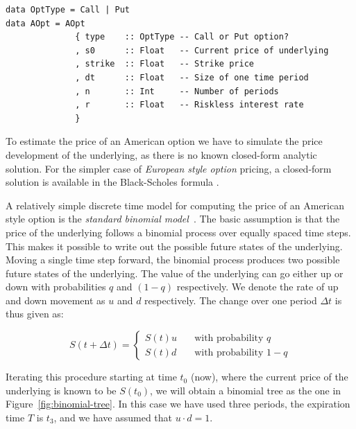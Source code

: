 \documentclass{llncs2e/llncs}
\begin{document}
\begin{verbatim}
data OptType = Call | Put
data AOpt = AOpt
              { type    :: OptType -- Call or Put option?
              , s0      :: Float   -- Current price of underlying
              , strike  :: Float   -- Strike price
              , dt      :: Float   -- Size of one time period
              , n       :: Int     -- Number of periods
              , r       :: Float   -- Riskless interest rate
              }
\end{verbatim}

To estimate the price of an American option we have to simulate the
price development of the underlying, as there is no known closed-form
analytic solution. For the simpler case of \emph{European style
  option} pricing, a closed-form solution is available in the
Black-Scholes formula \cite{black1973pricing}.

A relatively simple discrete time model for computing the price of an
American style option is the \emph{standard binomial
  model}~\cite{cox1979option}.  The basic assumption is that the price
of the underlying follows a binomial process over equally spaced time
steps. This makes it possible to write out the possible future states
of the underlying. Moving a single time step forward, the binomial
process produces two possible future states of the underlying. The
value of the underlying can go either up or down with probabilities
$q$ and $(1 - q)$ respectively. We denote the rate of up and down
movement as $u$ and $d$ respectively. The change over one period
$\Delta t$ is thus given as:

\begin{equation}
S(t+\Delta t) = \left\{
  \begin{array}{ll}
    S(t)u & \quad \textrm{with probability $q$} \\
    S(t)d & \quad \textrm{with probability $1-q$}
  \end{array} \right.
\end{equation}

Iterating this procedure starting at time $t_0$ (now), where the
current price of the underlying is known to be $S(t_0)$, we will
obtain a binomial tree as the one in
Figure~\ref{fig:binomial-tree}. In this case we have used three
periods, the expiration time $T$ is $t_3$, and we have assumed that
$u\cdot d = 1$.
\end{document}
